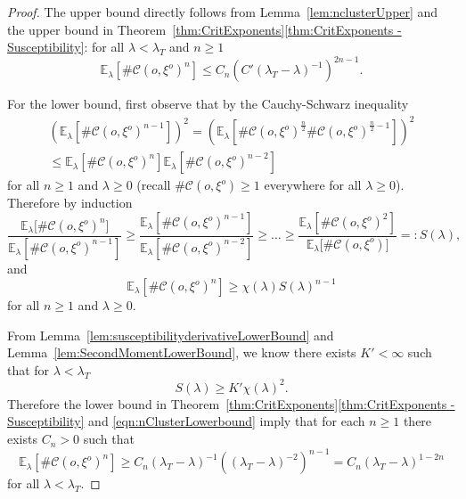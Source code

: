 \documentclass[10pt,a4paper,dvipsnames]{article}
\theoremstyle{definition}
\theoremstyle{remark}
\newcommand{\ela}{\mathbb E_{\lambda}}
\newcommand{\C}{\mathscr {C}}
\newcommand{\orig}{o}
\numberwithin{equation}{section}
\begin{document}
\begin{proof}
    The upper bound directly follows from Lemma~\ref{lem:nclusterUpper} and the upper bound in Theorem~\ref{thm:CritExponents}\ref{thm:CritExponents - Susceptibility}: for all $\lambda<\lambda_T$ and $n\geq 1$
    \begin{equation}
        \ela\left[\#\C\left(\orig,\xi^{\orig}\right)^n\right] \leq C_n\left(C'\left(\lambda_T-\lambda\right)^{-1}\right)^{2n-1}.
    \end{equation}

    For the lower bound, first observe that by the Cauchy-Schwarz inequality
    \begin{multline}
        \left(\ela\left[\#\C\left(\orig,\xi^{\orig}\right)^{n-1}\right]\right)^2 = \left(\ela\left[\#\C\left(\orig,\xi^{\orig}\right)^{\frac{n}{2}}\#\C\left(\orig,\xi^{\orig}\right)^{\frac{n}{2}-1}\right]\right)^2\\
        \leq \ela\left[\#\C\left(\orig,\xi^{\orig}\right)^n\right]\ela\left[\#\C\left(\orig,\xi^{\orig}\right)^{n-2}\right]
    \end{multline}
    for all $n\geq 1$ and $\lambda\geq 0$ (recall $\#\C\left(\orig,\xi^{\orig}\right)\geq 1$ everywhere for all $\lambda\geq 0$). Therefore by induction
    \begin{equation}
        \frac{\ela\Big[\#\C\left(\orig,\xi^{\orig}\right)^{n{}}\Big]}{\ela\left[\#\C\left(\orig,\xi^{\orig}\right)^{n-1}\right]} \geq \frac{\ela\left[\#\C\left(\orig,\xi^{\orig}\right)^{n-1}\right]}{\ela\left[\#\C\left(\orig,\xi^{\orig}\right)^{n-2}\right]}\geq \ldots \geq \frac{\ela\left[\#\C\left(\orig,\xi^{\orig}\right)^2\right]}{\ela\Big[\#\C\left(\orig,\xi^{\orig}\right)\Big]}=: S\left(\lambda\right),
    \end{equation}
    and
    \begin{equation}
    \label{eqn:nClusterLowerbound}
        \ela\left[\#\C\left(\orig,\xi^{\orig}\right)^n\right] \geq \chi\left(\lambda\right) S\left(\lambda\right)^{n-1}
    \end{equation}
    for all $n\geq 1$ and $\lambda\geq 0$.

    From Lemma~\ref{lem:susceptibilityderivativeLowerBound} and Lemma~\ref{lem:SecondMomentLowerBound}, we know there exists $K'<\infty$ such that for $\lambda<\lambda_T$
    \begin{equation}
        S\left(\lambda\right) \geq K'\chi\left(\lambda\right)^2.
    \end{equation}
    Therefore the lower bound in Theorem~\ref{thm:CritExponents}\ref{thm:CritExponents - Susceptibility} and \eqref{eqn:nClusterLowerbound} imply that for each $n\geq 1$ there exists $C_n>0$ such that
    \begin{equation}
        \ela\left[\#\C\left(\orig,\xi^{\orig}\right)^n\right] \geq C_n \left(\lambda_T-\lambda\right)^{-1}\left(\left(\lambda_T-\lambda\right)^{-2}\right)^{n-1} = C_n\left(\lambda_T-\lambda\right)^{1-2n}
    \end{equation}
    for all $\lambda<\lambda_T$.
\end{proof}
\end{document}
